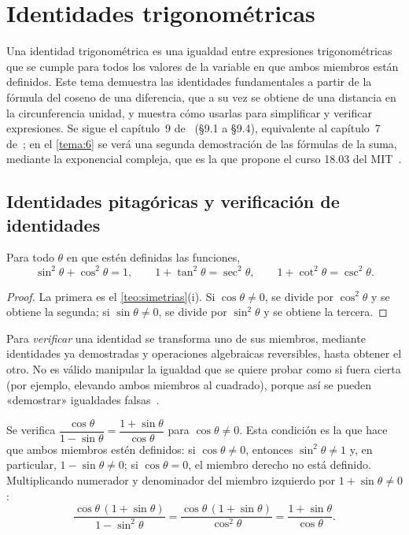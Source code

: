\chapter{Identidades trigonométricas}
\label{tema:2}

Una identidad trigonométrica es una igualdad entre expresiones trigonométricas que se cumple para todos los valores de la variable en que ambos miembros están definidos. Este tema demuestra las identidades fundamentales a partir de la fórmula del coseno de una diferencia, que a su vez se obtiene de una distancia en la circunferencia unidad, y muestra cómo usarlas para simplificar y verificar expresiones. Se sigue el capítulo~9 de~\cite{osat} (§9.1 a §9.4), equivalente al capítulo~7 de~\cite{osprecalc}; en el \cref{tema:6} se verá una segunda demostración de las fórmulas de la suma, mediante la exponencial compleja, que es la que propone el curso 18.03 del MIT~\cite[§6.4]{mit1803}.

\section{Identidades pitagóricas y verificación de identidades}

\begin{proposicion}\label{prop:pitagoricas}
Para todo $\theta$ en que estén definidas las funciones,
\[
\sin^{2}\theta+\cos^{2}\theta=1,\qquad 1+\tan^{2}\theta=\sec^{2}\theta,\qquad 1+\cot^{2}\theta=\csc^{2}\theta.
\]
\end{proposicion}

\begin{proof}
La primera es el \cref{teo:simetrias}(i). Si $\cos\theta\ne 0$, se divide por $\cos^{2}\theta$ y se obtiene la segunda; si $\sin\theta\ne 0$, se divide por $\sin^{2}\theta$ y se obtiene la tercera.
\end{proof}

Para \emph{verificar} una identidad se transforma uno de sus miembros, mediante identidades ya demostradas y operaciones algebraicas reversibles, hasta obtener el otro. No es válido manipular la igualdad que se quiere probar como si fuera cierta (por ejemplo, elevando ambos miembros al cuadrado), porque así se pueden «demostrar» igualdades falsas~\cite[§9.1]{osat}.

\begin{ejemplo}\label{ej:verificar}
Se verifica $\dfrac{\cos\theta}{1-\sin\theta}=\dfrac{1+\sin\theta}{\cos\theta}$ para $\cos\theta\ne 0$. Esta condición es la que hace que ambos miembros estén definidos: si $\cos\theta\ne0$, entonces $\sin^{2}\theta\ne1$ y, en particular, $1-\sin\theta\ne0$; si $\cos\theta=0$, el miembro derecho no está definido. Multiplicando numerador y denominador del miembro izquierdo por $1+\sin\theta\ne0$:
\[
\frac{\cos\theta\,(1+\sin\theta)}{1-\sin^{2}\theta}=\frac{\cos\theta\,(1+\sin\theta)}{\cos^{2}\theta}=\frac{1+\sin\theta}{\cos\theta}.
\]
\end{ejemplo}

